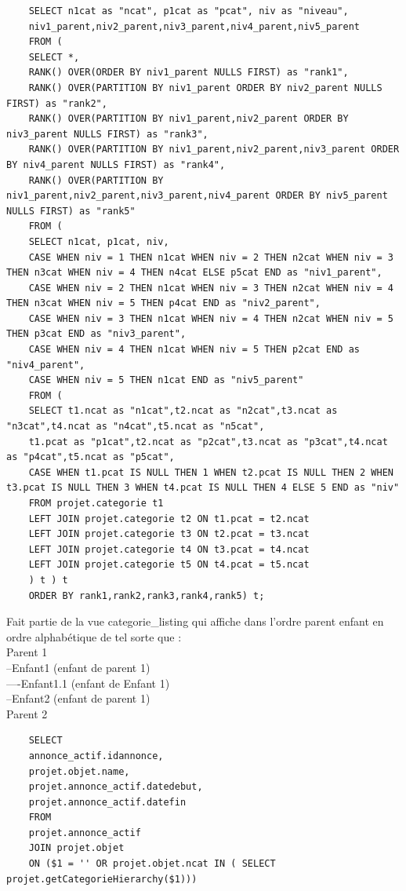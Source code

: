 \documentclass[a4paper,12pt]{article}
\begin{document}
\begin{spacing}{1}
	\begin{verbatim}
	SELECT n1cat as "ncat", p1cat as "pcat", niv as "niveau",
	niv1_parent,niv2_parent,niv3_parent,niv4_parent,niv5_parent
	FROM (
	SELECT *,
	RANK() OVER(ORDER BY niv1_parent NULLS FIRST) as "rank1",
	RANK() OVER(PARTITION BY niv1_parent ORDER BY niv2_parent NULLS FIRST) as "rank2",
	RANK() OVER(PARTITION BY niv1_parent,niv2_parent ORDER BY niv3_parent NULLS FIRST) as "rank3",
	RANK() OVER(PARTITION BY niv1_parent,niv2_parent,niv3_parent ORDER BY niv4_parent NULLS FIRST) as "rank4",
	RANK() OVER(PARTITION BY niv1_parent,niv2_parent,niv3_parent,niv4_parent ORDER BY niv5_parent NULLS FIRST) as "rank5"
	FROM (
	SELECT n1cat, p1cat, niv,
	CASE WHEN niv = 1 THEN n1cat WHEN niv = 2 THEN n2cat WHEN niv = 3 THEN n3cat WHEN niv = 4 THEN n4cat ELSE p5cat END as "niv1_parent",
	CASE WHEN niv = 2 THEN n1cat WHEN niv = 3 THEN n2cat WHEN niv = 4 THEN n3cat WHEN niv = 5 THEN p4cat END as "niv2_parent",
	CASE WHEN niv = 3 THEN n1cat WHEN niv = 4 THEN n2cat WHEN niv = 5 THEN p3cat END as "niv3_parent",
	CASE WHEN niv = 4 THEN n1cat WHEN niv = 5 THEN p2cat END as "niv4_parent",
	CASE WHEN niv = 5 THEN n1cat END as "niv5_parent"
	FROM (
	SELECT t1.ncat as "n1cat",t2.ncat as "n2cat",t3.ncat as "n3cat",t4.ncat as "n4cat",t5.ncat as "n5cat",
	t1.pcat as "p1cat",t2.ncat as "p2cat",t3.ncat as "p3cat",t4.ncat as "p4cat",t5.ncat as "p5cat",
	CASE WHEN t1.pcat IS NULL THEN 1 WHEN t2.pcat IS NULL THEN 2 WHEN t3.pcat IS NULL THEN 3 WHEN t4.pcat IS NULL THEN 4 ELSE 5 END as "niv"
	FROM projet.categorie t1
	LEFT JOIN projet.categorie t2 ON t1.pcat = t2.ncat
	LEFT JOIN projet.categorie t3 ON t2.pcat = t3.ncat
	LEFT JOIN projet.categorie t4 ON t3.pcat = t4.ncat
	LEFT JOIN projet.categorie t5 ON t4.pcat = t5.ncat
	) t ) t
	ORDER BY rank1,rank2,rank3,rank4,rank5) t;
	\end{verbatim}
	Fait partie de la vue categorie\_listing qui affiche dans l'ordre parent enfant en ordre alphabétique de tel sorte que :\\
	Parent 1\\
	--Enfant1 (enfant de parent 1)\\
	----Enfant1.1 (enfant de Enfant 1)\\
	--Enfant2 (enfant de parent 1)\\
	Parent 2\\
	\begin{verbatim}
	SELECT 
	annonce_actif.idannonce,
	projet.objet.name, 
	projet.annonce_actif.datedebut,
	projet.annonce_actif.datefin 
	FROM 
	projet.annonce_actif 
	JOIN projet.objet 
	ON ($1 = '' OR projet.objet.ncat IN ( SELECT projet.getCategorieHierarchy($1))) 

\end{verbatim}
\end{spacing}
\end{document}
